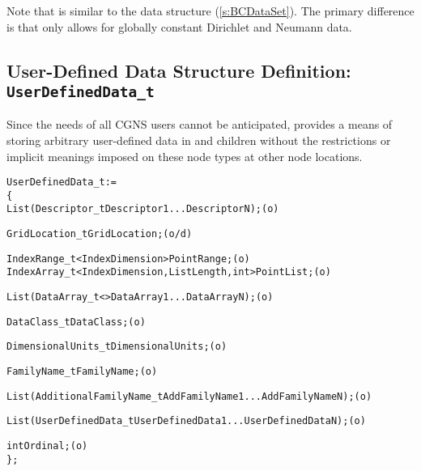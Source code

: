 Note that  is similar to the data structure
 (\autoref{s:BCDataSet}).  The primary difference is that
 only allows for globally constant Dirichlet and
Neumann data.

\subsection{ User-Defined Data Structure Definition: \texttt{UserDefinedData\_t}}
\label{s:UserDefinedData}

Since the needs of all CGNS users cannot be anticipated,
 provides a means of storing arbitrary
user-defined data in  and 
children without the restrictions or implicit meanings imposed on these
node types at other node locations.

\begin{alltt}
  UserDefinedData\_t :=
    \{
    List( Descriptor\_t Descriptor1 ... DescriptorN ) ;                      (o)

    GridLocation\_t GridLocation ;                                           (o/d)

    IndexRange\_t<IndexDimension> PointRange ;                               (o)
    IndexArray\_t<IndexDimension, ListLength, int> PointList ;               (o)

    List( DataArray\_t<> DataArray1 ... DataArrayN ) ;                       (o)

    DataClass\_t DataClass ;                                                 (o)

    DimensionalUnits\_t DimensionalUnits ;                                   (o)

    FamilyName\_t FamilyName ;                                               (o)

    List( AdditionalFamilyName\_t AddFamilyName1 ... AddFamilyNameN ) ;      (o)

    List( UserDefinedData\_t UserDefinedData1 ... UserDefinedDataN ) ;       (o)

    int Ordinal ;                                                           (o)
    \} ;
\end{alltt}

